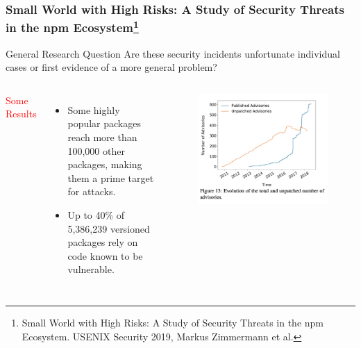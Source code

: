 \documentclass{beamer}
\begin{document}
\begin{frame}
\frametitle{Small World with High Risks: A Study of Security Threats in the npm Ecosystem\footnote{Small World with High Risks: A Study of Security Threats in the npm Ecosystem. USENIX Security 2019, Markus Zimmermann et al.}}
\begin{alertblock}{General Research Question}
Are these security incidents unfortunate individual cases or first evidence of a more general problem?
\end{alertblock}
\begin{columns}
\textcolor{red}{Some Results}
\begin{itemize}
    \item Some highly popular packages reach more than 100,000
other packages, making them a prime target for attacks.
    \item Up to 40\% of 5,386,239 versioned packages rely on code known to be
vulnerable.
\end{itemize}
\begin{figure}
    \centering
    \includegraphics[width=\textwidth]{risk.jpg}
\end{figure}
\end{columns}
\end{frame}
\end{document}
